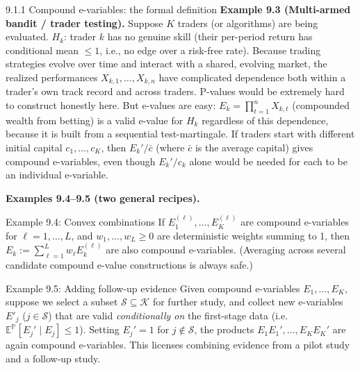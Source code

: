 \documentclass[aspectratio=169,10pt]{beamer}
\newcommand{\Kc}{\mathcal{K}}
\begin{document}
\begin{frame}[allowframebreaks]{9.1.1 Compound e-variables: the formal definition}
\textbf{Example 9.3 (Multi-armed bandit / trader testing).} Suppose $K$ traders (or algorithms) are being evaluated. $H_k$: trader $k$ has no genuine skill (their per-period return has conditional mean $\le 1$, i.e., no edge over a risk-free rate). Because trading strategies evolve over time and interact with a shared, evolving market, the realized performances $X_{k,1},\dots,X_{k,n}$ have complicated dependence both within a trader's own track record and across traders. P-values would be extremely hard to construct honestly here. But e-values are easy: $E_k = \prod_{t=1}^n X_{k,t}$ (compounded wealth from betting) is a valid e-value for $H_k$ regardless of this dependence, because it is built from a sequential test-martingale. If traders start with different initial capital $c_1,\dots,c_K$, then $E_k'/\bar c$ (where $\bar c$ is the average capital) gives compound e-variables, even though $E_k'/c_k$ alone would be needed for each to be an individual e-variable.

\framebreak

\textbf{Examples 9.4--9.5 (two general recipes).}

\begin{block}{Example 9.4: Convex combinations}
If $E_1^{(\ell)},\dots,E_K^{(\ell)}$ are compound e-variables for $\ell=1,\dots,L$, and $w_1,\dots,w_L\ge0$ are deterministic weights summing to 1, then $E_k := \sum_{\ell=1}^L w_\ell E_k^{(\ell)}$ are also compound e-variables. (Averaging across several candidate compound e-value constructions is always safe.)
\end{block}

\begin{block}{Example 9.5: Adding follow-up evidence}
Given compound e-variables $E_1,\dots,E_K$, suppose we select a subset $\mathcal{S}\subseteq\Kc$ for further study, and collect new e-variables $E'_j$ ($j\in\mathcal{S}$) that are valid \emph{conditionally on} the first-stage data (i.e. $\mathbb{E}^{\mathbb{P}}[E_j' \mid E_j] \le 1$). Setting $E_j'=1$ for $j\notin\mathcal{S}$, the products $E_1E_1',\dots,E_KE_K'$ are again compound e-variables. This licenses combining evidence from a pilot study and a follow-up study.
\end{block}

\end{frame}
\end{document}
